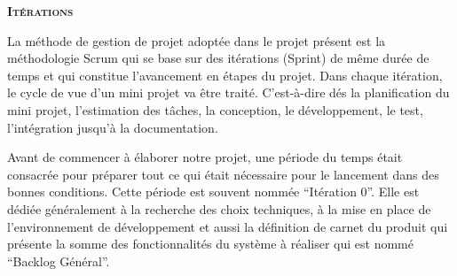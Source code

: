 \thispagestyle{plain}
\begin{center}
\vspace*{7cm}
\textbf{\scshape\Huge Itérations}
\end{center}
{}
\vspace{2cm}

La méthode de gestion de projet adoptée dans le projet présent est la
méthodologie Scrum qui se base sur des itérations (Sprint) de même durée de
temps et qui constitue l'avancement en étapes du projet. Dans chaque itération,
le cycle de vue d'un mini projet va être traité. C'est-à-dire dés la
planification du mini projet, l'estimation des tâches, la conception, le
développement, le test, l'intégration jusqu'à la documentation.

Avant de commencer à élaborer notre projet, une période du temps était
consacrée pour préparer tout ce qui était nécessaire pour le lancement dans des
bonnes conditions. Cette période est souvent nommée ``Itération 0''. Elle est
dédiée généralement à la recherche des choix techniques, à la mise en place de
l'environnement de développement et aussi la définition de carnet du produit
qui présente la somme des fonctionnalités du système à réaliser qui est nommé
``Backlog Général''.
